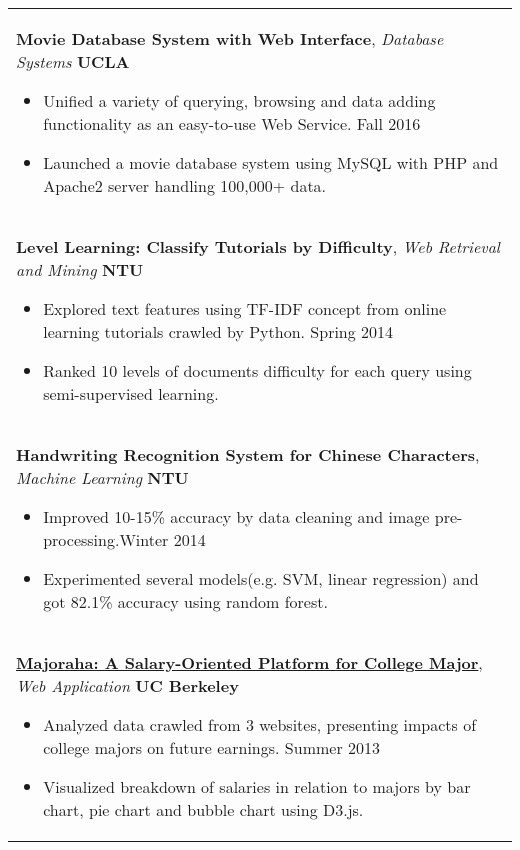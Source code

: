 \documentclass[a4paper,11pt]{article} %
\begin{document}
{\begin{tabular}{p{18.5cm}}
{\large\bf{Movie Database System with Web Interface}}, {\it{Database Systems}} \hfill {\bf{UCLA}}
\begin{itemize}
\item Unified a variety of querying, browsing and data adding functionality as an easy-to-use Web Service. \hfill Fall 2016
\item Launched a movie database system using MySQL with PHP and Apache2 server handling 100,000+ data.\vspace*{-\baselineskip}
\end{itemize} \\
\vspace{0.1mm}

{\large\bf{Level Learning: Classify Tutorials by Difficulty}}, {\it{Web Retrieval and Mining}} \hfill {\bf{NTU}}
\begin{itemize}
\item Explored text features using TF-IDF concept from online learning tutorials crawled by Python. \hfill Spring 2014
\item Ranked 10 levels of documents difficulty for each query using semi-supervised learning.\vspace*{-\baselineskip}
\end{itemize}\\
\vspace{.1mm}

{\large\bf{Handwriting Recognition System for Chinese Characters}}, {\it{Machine Learning}} \hfill \textbf{NTU}
\begin{itemize}
\item Improved 10-15\% accuracy by data cleaning and image pre-processing.\hfill Winter 2014
\item Experimented several models(e.g. SVM, linear regression) and got 82.1\% accuracy using random forest.\vspace*{-\baselineskip}
\end{itemize}\\
\vspace{.1mm}

{\large\bf{\href{http://people.ischool.berkeley.edu/~charleswang/i153/final/facetBrowser/index.html}{Majoraha: A Salary-Oriented Platform for College Major}}}, {\it{Web Application}} \hfill {\bf{UC Berkeley}}
\begin{itemize}
\item Analyzed data crawled from 3 websites, presenting impacts of college majors on future earnings. \hfill Summer 2013
\item Visualized breakdown of salaries in relation to majors by bar chart, pie chart and bubble chart using D3.js. \vspace*{-\baselineskip}
\end{itemize}\\


\end{tabular}}
\end{document}
